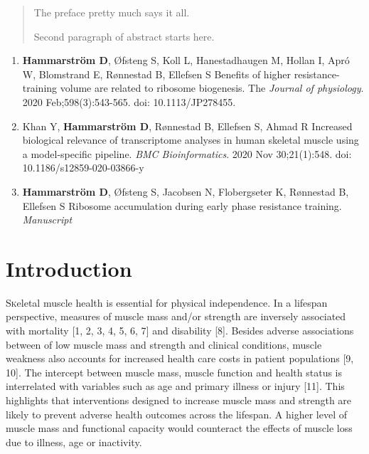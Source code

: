 \documentclass[twoside,10pt]{gihclass} %
\def\labelenumi{\Roman{enumi}.}
\begin{document}
  \begin{abstract}
    The preface pretty much says it all.

    \par

    Second paragraph of abstract starts here.
  \end{abstract}
  \begin{listofpapers}
    \begin{enumerate}
    \def\labelenumi{\Roman{enumi}.}
    \item
      \textbf{Hammarström D}, Øfsteng S, Koll L, Hanestadhaugen M, Hollan I, Apró W, Blomstrand E, Rønnestad B, Ellefsen S Benefits of higher resistance-training volume are related to ribosome biogenesis. The \emph{Journal of physiology}. 2020 Feb;598(3):543-565. doi: 10.1113/JP278455.
    \item
      Khan Y, \textbf{Hammarström D}, Rønnestad B, Ellefsen S, Ahmad R Increased biological relevance of transcriptome analyses in human skeletal muscle using a model-specific pipeline. \emph{BMC Bioinformatics}. 2020 Nov 30;21(1):548. doi: 10.1186/s12859-020-03866-y
    \item
      \textbf{Hammarström D}, Øfsteng S, Jacobsen N, Flobergseter K, Rønnestad B, Ellefsen S Ribosome accumulation during early phase resistance training. \emph{Manuscript}
    \end{enumerate}
  \end{listofpapers}

  \hypersetup{linkcolor=black}
  \setcounter{tocdepth}{2}
  \tableofcontents

  \listoftables

  \listoffigures




\mainmatter %
\pagestyle{fancyplain} %

\setcounter{DefaultLines}{3}

\hypertarget{introduction}{%
\chapter{Introduction}\label{introduction}}

\lettrine{S}keletal muscle health is essential for physical independence. In a lifespan perspective, measures of muscle mass and/or strength are inversely associated with mortality
{[}1, 2, 3, 4, 5, 6, 7{]}
and disability
{[}8{]}.
Besides adverse associations between of low muscle mass and strength and clinical conditions, muscle weakness also accounts for increased health care costs in patient populations
{[}9, 10{]}.
The intercept between muscle mass, muscle function and health status is interrelated with variables such as age and primary illness or injury
{[}11{]}.
This highlights that interventions designed to increase muscle mass and strength are likely to prevent adverse health outcomes across the lifespan. A higher level of muscle mass and functional capacity would counteract the effects of muscle loss due to illness, age or inactivity.
\end{document}
